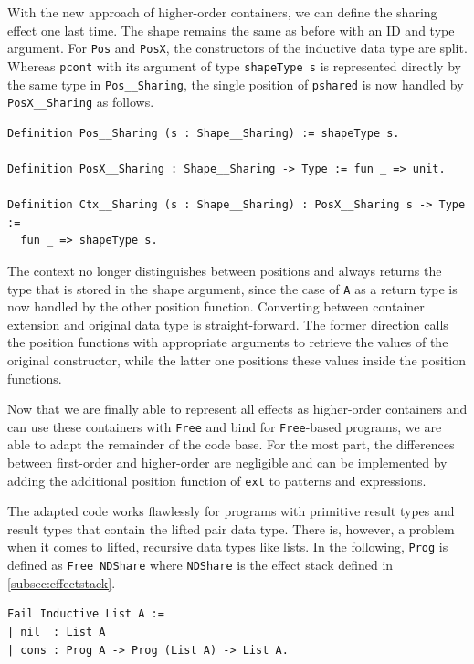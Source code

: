 \documentclass[a4paper, 11pt, fleqn, twoside, abstract=on]{scrreprt}
\newcommand{\cinl}[1]{\texttt{#1}}
\begin{document}
With the new approach of higher-order containers, we can define the sharing effect one last time.
The shape remains the same as before with an ID and type argument.
For \cinl{Pos} and \cinl{PosX}, the constructors of the inductive data type are split.
Whereas \cinl{pcont} with its argument of type \cinl{shapeType s} is represented directly by the same type in \cinl{Pos__Sharing}, the single position of \cinl{pshared} is now handled by \cinl{PosX__Sharing} as follows.

\begin{verbatim}
Definition Pos__Sharing (s : Shape__Sharing) := shapeType s.

Definition PosX__Sharing : Shape__Sharing -> Type := fun _ => unit.

Definition Ctx__Sharing (s : Shape__Sharing) : PosX__Sharing s -> Type :=
  fun _ => shapeType s.
\end{verbatim}

The context no longer distinguishes between positions and always returns the type that is stored in the shape argument, since the case of \cinl{A} as a return type is now handled by the other position function.
Converting between container extension and original data type is straight-forward.
The former direction calls the position functions with appropriate arguments to retrieve the values of the original constructor, while the latter one positions these values inside the position functions.

Now that we are finally able to represent all effects as higher-order containers and can use these containers with \cinl{Free} and bind for \cinl{Free}-based programs, we are able to adapt the remainder of the code base.
For the most part, the differences between first-order and higher-order are negligible and can be implemented by adding the additional position function of \cinl{ext} to patterns and expressions.

The adapted code works flawlessly for programs with primitive result types and result types that contain the lifted pair data type.
There is, however, a problem when it comes to lifted, recursive data types like lists.
In the following, \cinl{Prog} is defined as \cinl{Free NDShare} where \cinl{NDShare} is the effect stack defined in \autoref{subsec:effectstack}.

\begin{verbatim}
Fail Inductive List A :=
| nil  : List A
| cons : Prog A -> Prog (List A) -> List A.
\end{verbatim}
\end{document}
